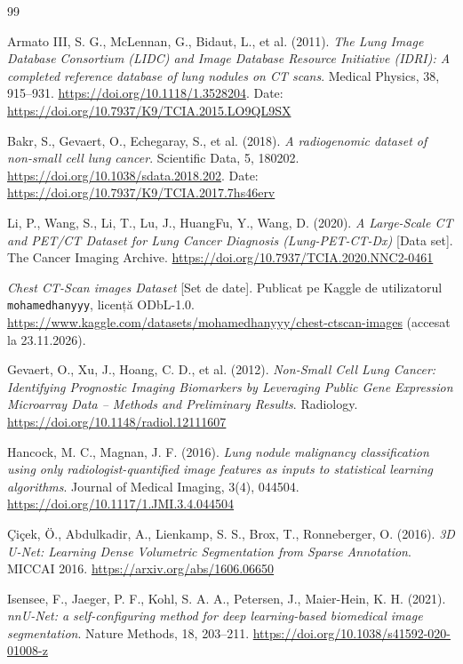 \documentclass[11pt, a4paper]{article}
\begin{document}
\begin{thebibliography}{99}

Armato III, S. G., McLennan, G., Bidaut, L., et al. (2011).
\textit{The Lung Image Database Consortium (LIDC) and Image Database Resource Initiative (IDRI): A completed reference database of lung nodules on CT scans}.
Medical Physics, 38, 915--931. \url{https://doi.org/10.1118/1.3528204}.
Date: \url{https://doi.org/10.7937/K9/TCIA.2015.LO9QL9SX}

Bakr, S., Gevaert, O., Echegaray, S., et al. (2018).
\textit{A radiogenomic dataset of non-small cell lung cancer}.
Scientific Data, 5, 180202. \url{https://doi.org/10.1038/sdata.2018.202}.
Date: \url{https://doi.org/10.7937/K9/TCIA.2017.7hs46erv}

Li, P., Wang, S., Li, T., Lu, J., HuangFu, Y., Wang, D. (2020).
\textit{A Large-Scale CT and PET/CT Dataset for Lung Cancer Diagnosis (Lung-PET-CT-Dx)} [Data set].
The Cancer Imaging Archive. \url{https://doi.org/10.7937/TCIA.2020.NNC2-0461}

\textit{Chest CT-Scan images Dataset} [Set de date]. Publicat pe Kaggle de utilizatorul \texttt{mohamedhanyyy}, licență ODbL-1.0.
\url{https://www.kaggle.com/datasets/mohamedhanyyy/chest-ctscan-images} (accesat la 23.11.2026).

Gevaert, O., Xu, J., Hoang, C. D., et al. (2012).
\textit{Non-Small Cell Lung Cancer: Identifying Prognostic Imaging Biomarkers by Leveraging Public Gene Expression Microarray Data -- Methods and Preliminary Results}.
Radiology. \url{https://doi.org/10.1148/radiol.12111607}

Hancock, M. C., Magnan, J. F. (2016).
\textit{Lung nodule malignancy classification using only radiologist-quantified image features as inputs to statistical learning algorithms}.
Journal of Medical Imaging, 3(4), 044504. \url{https://doi.org/10.1117/1.JMI.3.4.044504}

Çiçek, Ö., Abdulkadir, A., Lienkamp, S. S., Brox, T., Ronneberger, O. (2016).
\textit{3D U-Net: Learning Dense Volumetric Segmentation from Sparse Annotation}.
MICCAI 2016. \url{https://arxiv.org/abs/1606.06650}

Isensee, F., Jaeger, P. F., Kohl, S. A. A., Petersen, J., Maier-Hein, K. H. (2021).
\textit{nnU-Net: a self-configuring method for deep learning-based biomedical image segmentation}.
Nature Methods, 18, 203--211. \url{https://doi.org/10.1038/s41592-020-01008-z}


\end{thebibliography}
\end{document}

